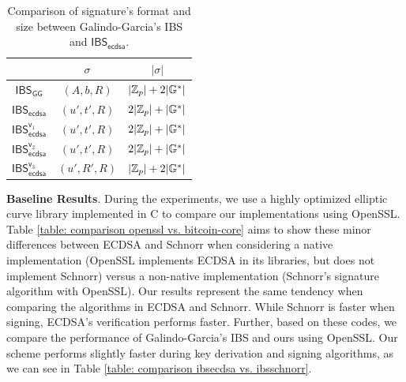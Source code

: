 \documentclass[version=submission, floatrow]{iacrcc}
\begin{document}
\begin{table}[H]
    \centering
    \begin{tabular}{c|c|c}
         \hline & $\sigma$ & $|\sigma|$\\
         \hline $\mathsf{IBS}_{\mathsf{GG}}$ & $\left(A, b, R\right)$ & $|\mathbb{Z}_{p}| + 2|\mathbb{G}^{\ast}|$ \\
         \hline $\mathsf{IBS}_{\mathsf{ecdsa}}$ & $\left(u', t', R\right)$ & $2|\mathbb{Z}_{p}| + |\mathbb{G}^{\ast}|$ \\
         \hline $\mathsf{IBS}_{\mathsf{ecdsa}}^{\mathsf{v}_{1}}$ & $\left(u', t', R\right)$ & $2|\mathbb{Z}_{p}| + |\mathbb{G}^{\ast}|$ \\
         \hline $\mathsf{IBS}_{\mathsf{ecdsa}}^{\mathsf{v}_{2}}$ & $\left(u', t', R\right)$ & $2|\mathbb{Z}_{p}| + |\mathbb{G}^{\ast}|$ \\
         \hline $\mathsf{IBS}_{\mathsf{ecdsa}}^{\mathsf{v}_{3}}$ & $\left(u', R', R\right)$ & $|\mathbb{Z}_{p}| + 2|\mathbb{G}^{\ast}|$ \\
         \hline
    \end{tabular}
    \caption{Comparison of signature's format and size between Galindo-Garcia's IBS and $\mathsf{IBS}_{\mathsf{ecdsa}}$.}
    \label{table: signature size}
\end{table}

\noindent\textbf{Baseline Results}. During the experiments, we use a highly optimized elliptic curve library implemented in C to compare our implementations using OpenSSL.
%
Table \ref{table: comparison openssl vs. bitcoin-core} aims to show these minor differences between ECDSA and Schnorr when considering a native implementation (OpenSSL implements ECDSA in its libraries, but does not implement Schnorr) versus a non-native implementation (Schnorr's signature algorithm with OpenSSL).
%
Our results represent the same tendency when comparing the algorithms in ECDSA and Schnorr.
%
While Schnorr is faster when signing, ECDSA's verification performs faster. Further, based on these codes, we compare the performance of Galindo-Garcia's IBS and ours using OpenSSL.
%
Our scheme performs slightly faster during key derivation and signing algorithms, as we can see in Table \ref{table: comparison ibsecdsa vs. ibsschnorr}.
\end{document}
